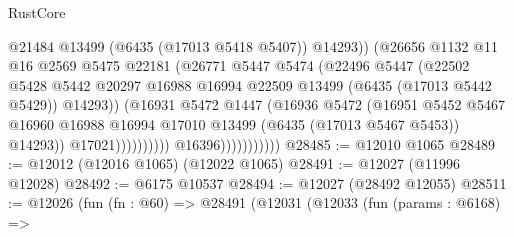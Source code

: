 \begin{lexlean}{RustCore}
\begin{coremodule}
                                            @21484
                                            @13499
                                            (@6435 (@17013 @5418 @5407))
                                            @14293))
                                        (@26656
                                          @1132
                                          @11
                                          @16
                                          @2569
                                          @5475
                                          @22181
                                          (@26771
                                            @5447
                                            @5474
                                            (@22496
                                              @5447
                                              (@22502
                                                @5428
                                                @5442
                                                @20297
                                                @16988
                                                @16994
                                                @22509
                                                @13499
                                                (@6435 (@17013 @5442 @5429))
                                                @14293))
                                            (@16931
                                              @5472
                                              @1447
                                              (@16936
                                                @5472
                                                (@16951
                                                  @5452
                                                  @5467
                                                  @16960
                                                  @16988
                                                  @16994
                                                  @17010
                                                  @13499
                                                  (@6435 (@17013 @5467 @5453))
                                                  @14293))
                                              @17021))))))))))
                          @16396)))))))))))
@28485 := @12010 @1065
@28489 := @12012 (@12016 @1065) (@12022 @1065)
@28491 := @12027 (@11996 @12028)
@28492 := @6175 @10537
@28494 := @12027 (@28492 @12055)
@28511 := @12026
    (fun (fn : @60) =>
    @28491
      (@12031
        (@12033
          (fun (params : @6168) =>

\end{coremodule}
\end{lexlean}
